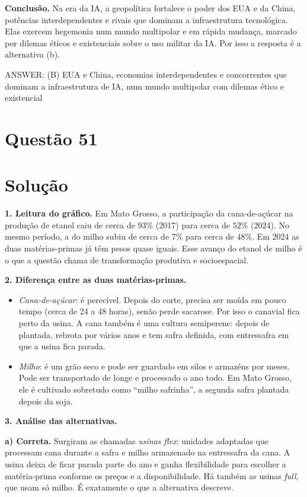 \documentclass{article}%
\begin{document}
\textbf{Conclusão.} Na era da IA, a geopolítica fortalece o poder dos EUA e da China, potências interdependentes e rivais que dominam a infraestrutura tecnológica. Elas exercem hegemonia num mundo multipolar e em rápida mudança, marcado por dilemas éticos e existenciais sobre o uso militar da IA. Por isso a resposta é a alternativa (b).

ANSWER: (B) EUA e China, economias interdependentes e concorrentes que dominam a infraestrutura de IA, num mundo multipolar com dilemas ético e existencial%
\newpage%
\section*{Questão 51}

\section*{Solução}

\textbf{1. Leitura do gráfico.} Em Mato Grosso, a participação da cana-de-açúcar na produção de etanol caiu de cerca de $93\%$ (2017) para cerca de $52\%$ (2024). No mesmo período, a do milho subiu de cerca de $7\%$ para cerca de $48\%$. Em 2024 as duas matérias-primas já têm pesos quase iguais. Esse avanço do etanol de milho é o que a questão chama de transformação produtiva e socioespacial.

\textbf{2. Diferença entre as duas matérias-primas.}
\begin{itemize}
\item \emph{Cana-de-açúcar}: é perecível. Depois do corte, precisa ser moída em pouco tempo (cerca de 24 a 48 horas), senão perde sacarose. Por isso o canavial fica perto da usina. A cana também é uma cultura semiperene: depois de plantada, rebrota por vários anos e tem safra definida, com entressafra em que a usina fica parada.
\item \emph{Milho}: é um grão seco e pode ser guardado em silos e armazéns por meses. Pode ser transportado de longe e processado o ano todo. Em Mato Grosso, ele é cultivado sobretudo como ``milho safrinha'', a segunda safra plantada depois da soja.
\end{itemize}

\textbf{3. Análise das alternativas.}

\textbf{a) Correta.} Surgiram as chamadas \emph{usinas flex}: unidades adaptadas que processam cana durante a safra e milho armazenado na entressafra da cana. A usina deixa de ficar parada parte do ano e ganha flexibilidade para escolher a matéria-prima conforme os preços e a disponibilidade. Há também as usinas \emph{full}, que usam só milho. É exatamente o que a alternativa descreve.
\end{document}
